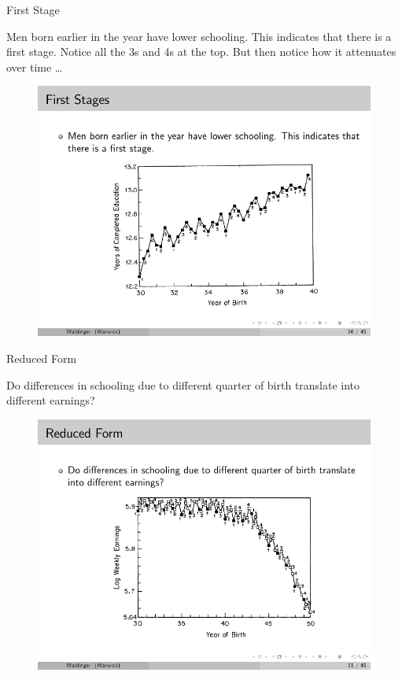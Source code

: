 \documentclass{beamer}
\begin{document}
\begin{frame}{First Stage}

  Men born earlier in the year have lower schooling. This indicates that there is a first stage. Notice all the 3s and 4s at the top. But then notice how it attenuates over time \dots

  \begin{figure}
    \includegraphics{./lecture_includes/qob_2.pdf}
  \end{figure}

\end{frame}


\begin{frame}{Reduced Form}

  Do differences in schooling due to different quarter of birth translate into different earnings?

  \begin{figure}
    \includegraphics{./lecture_includes/qob_3.pdf}
  \end{figure}

\end{frame}
\end{document}

